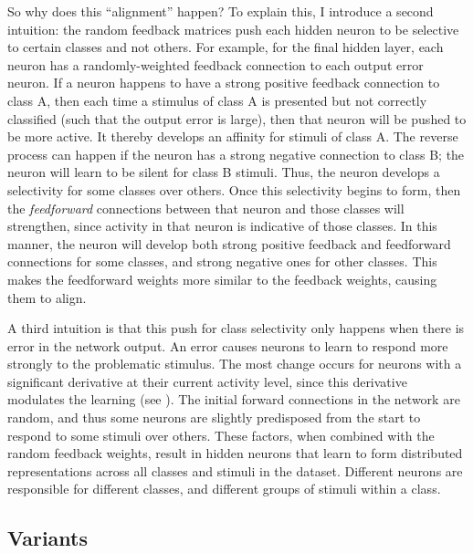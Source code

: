 So why does this ``alignment'' happen?
To explain this, I introduce a second intuition:
the random feedback matrices push each hidden neuron
to be selective to certain classes and not others.
For example, for the final hidden layer,
each neuron has a randomly-weighted feedback connection to each output error neuron.
If a neuron happens to have a strong positive feedback connection to class A,
then each time a stimulus of class A is presented but not correctly classified
(such that the output error is large),
then that neuron will be pushed to be more active.
It thereby develops an affinity for stimuli of class A.
The reverse process can happen if the neuron has a strong negative connection
to class B; the neuron will learn to be silent for class B stimuli.
Thus, the neuron develops a selectivity for some classes over others.
Once this selectivity begins to form,
then the \emph{feedforward} connections
between that neuron and those classes will strengthen,
since activity in that neuron is indicative of those classes.
In this manner, the neuron will develop both strong positive feedback
and feedforward connections for some classes,
and strong negative ones for other classes.
This makes the feedforward weights more similar to the feedback weights,
causing them to align.

A third intuition is that this push for class selectivity
only happens when there is error in the network output.
An error causes neurons to learn to respond more strongly to the problematic stimulus.
The most change occurs for neurons with a significant derivative
at their current activity level,
since this derivative modulates the learning (see ).
The initial forward connections in the network are random,
and thus some neurons are slightly predisposed from the start
to respond to some stimuli over others.
These factors, when combined with the random feedback weights,
result in hidden neurons that learn to form distributed representations
across all classes and stimuli in the dataset.
Different neurons are responsible for different classes,
and different groups of stimuli within a class.


\subsection{Variants}

\begin{figure}
  \centering
  
\end{figure}

